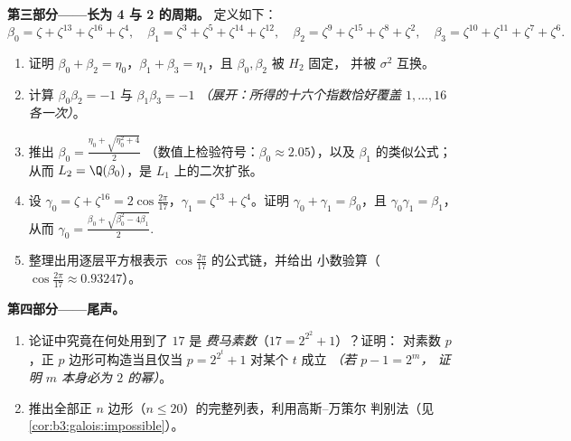 \begin{problem}
\medskip
\noindent\textbf{第三部分——长为 4 与 2 的周期。}
定义如下：
\[
\beta_0 = \zeta + \zeta^{13} + \zeta^{16} + \zeta^{4},\quad
\beta_1 = \zeta^3 + \zeta^5 + \zeta^{14} + \zeta^{12},\quad
\beta_2 = \zeta^9 + \zeta^{15} + \zeta^{8} + \zeta^{2},\quad
\beta_3 = \zeta^{10} + \zeta^{11} + \zeta^{7} + \zeta^{6}.
\]
\begin{enumerate}[resume]
  \item 证明 $\beta_0 + \beta_2 = \eta_0$，$\beta_1 + \beta_3 =
        \eta_1$，且 $\beta_0, \beta_2$ 被 $H_2$ 固定，
        并被 $\sigma^2$ 互换。
  \item 计算 $\beta_0\beta_2 = -1$ 与 $\beta_1\beta_3 = -1$
        \emph{（展开：所得的十六个指数恰好覆盖
        $1, \dots, 16$ 各一次）}。
  \item 推出 $\beta_0 = \frac{\eta_0 + \sqrt{\eta_0^2 + 4}}2$
        （数值上检验符号：$\beta_0 \approx 2.05$），以及
        $\beta_1$ 的类似公式；从而 $L_2 =
        \Q(\beta_0)$，是 $L_1$ 上的二次扩张。
  \item 设 $\gamma_0 = \zeta + \zeta^{16} =
        2\cos\frac{2\pi}{17}$，$\gamma_1 = \zeta^{13} +
        \zeta^4$。证明 $\gamma_0 + \gamma_1 = \beta_0$，且
        $\gamma_0\gamma_1 = \beta_1$，从而 $\gamma_0 =
        \frac{\beta_0 + \sqrt{\beta_0^2 - 4\beta_1}}2$.
  \item 整理出用逐层平方根表示
        $\cos\frac{2\pi}{17}$ 的公式链，并给出
        小数验算（$\cos\frac{2\pi}{17} \approx 0.93247$）。
\end{enumerate}

\medskip
\noindent\textbf{第四部分——尾声。}
\begin{enumerate}[resume]
  \item 论证中究竟在何处用到了 $17$ 是
        \emph{费马素数}（$17 = 2^{2^2} + 1$）？证明：
        对素数 $p$，正 $p$ 边形可构造当且仅当 $p
        = 2^{2^t} + 1$ 对某个 $t$ 成立 \emph{（若 $p - 1 = 2^m$，
        证明 $m$ 本身必为 $2$ 的幂）}。
  \item 推出全部正
        $n$ 边形（$n \leq 20$）的完整列表，利用高斯--万策尔
        判别法（见\cref{cor:b3:galois:impossible}）。
\end{enumerate}


\end{problem}
